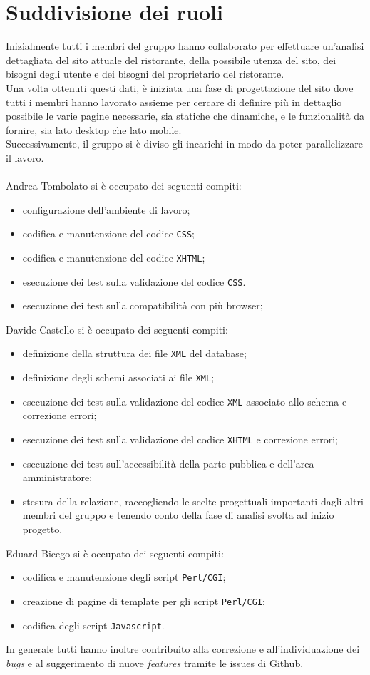\documentclass[../relazione.tex]{subfiles}
\begin{document}
\section{Suddivisione dei ruoli}
	Inizialmente tutti i membri del gruppo hanno collaborato per effettuare un'analisi dettagliata del sito attuale del ristorante, della possibile utenza del sito, dei bisogni degli utente e dei bisogni del proprietario del ristorante.\\
	Una volta ottenuti questi dati, è iniziata una fase di progettazione del sito dove tutti i membri hanno lavorato assieme per cercare di definire più in dettaglio possibile le varie pagine necessarie, sia statiche che dinamiche, e le funzionalità da fornire, sia lato desktop che lato mobile.\\
	Successivamente, il gruppo si è diviso gli incarichi in modo da poter parallelizzare il lavoro.
	\\\\Andrea Tombolato si è occupato dei seguenti compiti:
	\begin{itemize}
		\item configurazione dell’ambiente di lavoro;
		\item codifica e manutenzione del codice \texttt{CSS};
		\item codifica e manutenzione del codice \texttt{XHTML};
		\item esecuzione dei test sulla validazione del codice \texttt{CSS}.
		\item esecuzione dei test sulla compatibilità con più browser;
	\end{itemize}
	Davide Castello si è occupato dei seguenti compiti:
	\begin{itemize}
		\item definizione della struttura dei file \texttt{XML} del database;
		\item definizione degli schemi associati ai file \texttt{XML};
		\item esecuzione dei test sulla validazione del codice \texttt{XML} associato allo schema e correzione errori;
		\item esecuzione dei test sulla validazione del codice \texttt{XHTML} e correzione errori;
		\item esecuzione dei test sull’accessibilità della parte pubblica e dell'area amministratore;
		\item stesura della relazione, raccogliendo le scelte progettuali importanti dagli altri membri del gruppo e tenendo conto della fase di analisi svolta ad inizio progetto.
	\end{itemize}
	Eduard Bicego si è occupato dei seguenti compiti:
	\begin{itemize}
		\item codifica e manutenzione degli script \texttt{Perl/CGI};
		\item creazione di pagine di template per gli script \texttt{Perl/CGI};
		\item codifica degli script \texttt{Javascript}.
	\end{itemize}
	In generale tutti hanno inoltre contribuito alla correzione e all’individuazione dei \textit{bugs} e al suggerimento di nuove \textit{features} tramite le issues di Github.
\end{document}
